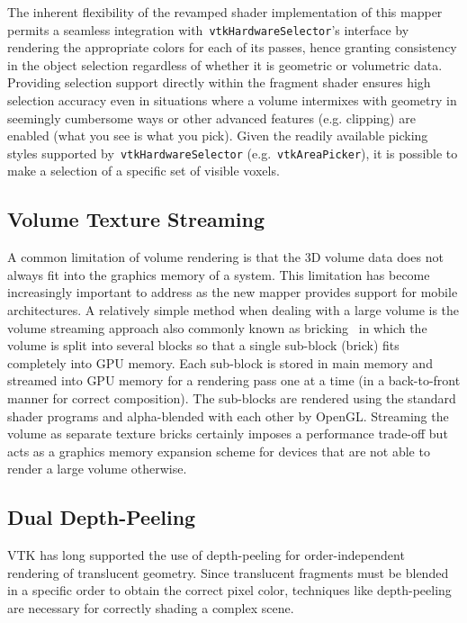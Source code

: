 The inherent flexibility of the revamped shader implementation of this mapper
permits a seamless integration with~\texttt{vtkHardwareSelector}'s interface by
rendering the appropriate colors for each of its passes, hence granting
consistency in the object selection regardless of whether it is geometric or
volumetric data.  Providing selection support directly within the fragment
shader ensures high selection accuracy even in situations where a volume
intermixes with geometry in seemingly cumbersome ways or other advanced features
(e.g. clipping) are enabled (what you see is what you pick).  Given the readily
available picking styles supported by~\texttt{vtkHardwareSelector}
(e.g.~\texttt{vtkAreaPicker}), it is possible to make a selection of a specific
set of visible voxels.

\subsection{Volume Texture Streaming}
\label{streaming}
A common limitation of volume rendering is that the 3D volume data does not
always fit into the graphics memory of a system. This limitation has become
increasingly important to address as the new mapper provides support for mobile
architectures.  A relatively simple method when dealing with a large volume is
the volume streaming approach also commonly known as
bricking~\citep{engel_real-time_2006} in which the volume is split into several
blocks so that a single sub-block (brick) fits completely into GPU memory.  Each
sub-block is stored in main memory and streamed into GPU memory for a rendering
pass one at a time (in a back-to-front manner for correct composition). The
sub-blocks are rendered using the standard shader programs and alpha-blended
with each other by OpenGL. Streaming the volume as separate texture bricks
certainly imposes a performance trade-off but acts as a graphics memory
expansion scheme for devices that are not able to render a large volume
otherwise.

\subsection{Dual Depth-Peeling}
\label{peeling}
VTK has long supported the use of depth-peeling for order-independent rendering
of translucent geometry. Since translucent fragments must be blended in a
specific order to obtain the correct pixel color, techniques like depth-peeling
are necessary for correctly shading a complex scene.

